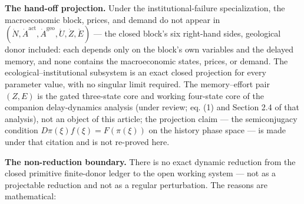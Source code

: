 \documentclass[11pt]{article}
\begin{document}
\textbf{The hand-off projection.} Under the institutional-failure
specialization, the macroeconomic block, prices, and demand do not
appear in
\((\dot N, \dot A^{\mathrm{act}}, \dot A^{\mathrm{geo}}, \dot U, \dot Z, \dot E)\)
--- the closed block's six right-hand sides, geological donor included:
each depends only on the block's own variables and the delayed memory,
and none contains the macroeconomic states, prices, or demand. The
ecological--institutional subsystem is an exact closed projection for
every parameter value, with no singular limit required. The
memory--effort pair \((Z, E)\) is the gated three-state core and working
four-state core of the companion delay-dynamics analysis (under review;
eq. (1) and Section 2.4 of that analysis), not an object of this
article; the projection claim --- the semiconjugacy condition
\(D\pi(\xi) f(\xi) = F(\pi(\xi))\) on the history phase space --- is
made under that citation and is not re-proved here.

\textbf{The non-reduction boundary.} There is no exact dynamic reduction
from the closed primitive finite-donor ledger to the open working system
--- not as a projectable reduction and not as a regular perturbation.
The reasons are mathematical:
\end{document}
